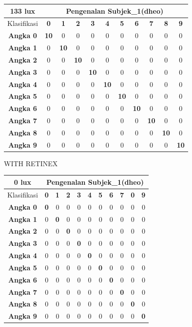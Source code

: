 \begin{tabular}{|c|c|c|c|c|c|c|c|c|c|c|}
	\hline 133 lux
	& \multicolumn{10}{|c|}{Pengenalan Subjek\_1(dheo)} \\
	\hline  Klasifikasi&\textbf{0} &\textbf{1} &\textbf{2} &\textbf{3} &\textbf{4}&\textbf{5} &\textbf{6}&\textbf{7}&\textbf{8}&\textbf{9}\\
	\hline \textbf{Angka 0} &\textbf{10} &0 &0 &0 &0 &0 &0 &0 &0 &0\\
	\hline \textbf{Angka 1} &0 &\textbf{10} &0 &0 &0 &0 &0 &0 &0 &0\\
	\hline \textbf{Angka 2} &0 &0 &\textbf{10} &0 &0 &0 &0 &0 &0 &0\\
	\hline \textbf{Angka 3} &0 &0 &0 &\textbf{10} &0 &0 &0 &0 &0 &0\\
	\hline \textbf{Angka 4} &0 &0 &0 &0 &\textbf{10} &0 &0 &0 &0 &0\\
	\hline \textbf{Angka 5} &0 &0 &0 &0 &0 &\textbf{10} &0 &0 &0 &0\\
	\hline \textbf{Angka 6} &0 &0 &0 &0 &0 &0 &\textbf{10} &0 &0 &0\\
	\hline \textbf{Angka 7} &0 &0 &0 &0 &0 &0 &0 &\textbf{10} &0 &0\\
	\hline \textbf{Angka 8} &0 &0 &0 &0 &0 &0 &0 &0 &\textbf{10} &0 \\
	\hline \textbf{Angka 9} &0 &0 &0 &0 &0 &0 &0 &0 &0 &\textbf{10} \\
	\hline
\end{tabular}

WITH RETINEX

\begin{tabular}{|c|c|c|c|c|c|c|c|c|c|c|}
	\hline 0 lux
	& \multicolumn{10}{|c|}{Pengenalan Subjek\_1(dheo)} \\
	\hline  Klasifikasi&\textbf{0} &\textbf{1} &\textbf{2} &\textbf{3} &\textbf{4}&\textbf{5} &\textbf{6}&\textbf{7}&\textbf{0}&\textbf{9}\\
	\hline \textbf{Angka 0} &\textbf{0} &0 &0 &0 &0 &0 &0 &0 &0 &0\\
	\hline \textbf{Angka 1} &0 &\textbf{0} &0 &0 &0 &0 &0 &0 &0 &0\\
	\hline \textbf{Angka 2} &0 &0 &\textbf{0} &0 &0 &0 &0 &0 &0 &0\\
	\hline \textbf{Angka 3} &0 &0 &0 &\textbf{0} &0 &0 &0 &0 &0 &0\\
	\hline \textbf{Angka 4} &0 &0 &0 &0 &\textbf{0} &0 &0 &0 &0 &0\\
	\hline \textbf{Angka 5} &0 &0 &0 &0 &0 &\textbf{0} &0 &0 &0 &0\\
	\hline \textbf{Angka 6} &0 &0 &0 &0 &0 &0 &\textbf{0} &0 &0 &0\\
	\hline \textbf{Angka 7} &0 &0 &0 &0 &0 &0 &0 &\textbf{0} &0 &0\\
	\hline \textbf{Angka 8} &0 &0 &0 &0 &0 &0 &0 &0 &\textbf{0} &0 \\
	\hline \textbf{Angka 9} &0 &0 &0 &0 &0 &0 &0 &0 &0 &\textbf{0} \\
	\hline
\end{tabular}


